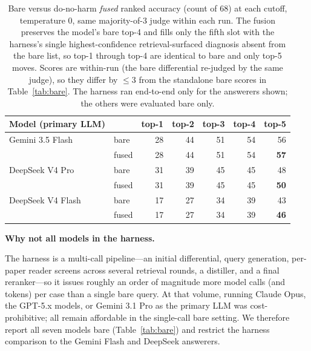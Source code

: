 \documentclass{article}
\renewcommand{\paragraph}[1]{%
  \par\addvspace{0.42\baselineskip}%
  \noindent\textbf{#1}\par\nobreak\vspace{-0.28\baselineskip}%
}
\begin{document}
\begin{table}[t]
\centering
\begin{tabular}{llrrrrr}
\toprule
Model (primary LLM) & & top-1 & top-2 & top-3 & top-4 & top-5 \\
\midrule
Gemini 3.5 Flash  & bare  & 28 & 44 & 51 & 54 & 56 \\
                  & fused & 28 & 44 & 51 & 54 & \textbf{57} \\
\midrule
DeepSeek V4 Pro   & bare  & 31 & 39 & 45 & 45 & 48 \\
                  & fused & 31 & 39 & 45 & 45 & \textbf{50} \\
\midrule
DeepSeek V4 Flash & bare  & 17 & 27 & 34 & 39 & 43 \\
                  & fused & 17 & 27 & 34 & 39 & \textbf{46} \\
\bottomrule
\end{tabular}
\caption{Bare versus do-no-harm \emph{fused} ranked accuracy (count of 68) at each cutoff, temperature 0,
same majority-of-3 judge within each run. The fusion preserves the model's bare top-4 and fills only the
fifth slot with the harness's single highest-confidence retrieval-surfaced diagnosis absent from the bare
list, so top-1 through top-4 are identical to bare and only top-5 moves. Scores are within-run (the bare
differential re-judged by the same judge), so they differ by $\le 3$ from the standalone bare scores in
Table~\ref{tab:bare}. The harness ran end-to-end only for the answerers shown; the others were evaluated
bare only.}
\label{tab:harness}
\end{table}

\paragraph{Why not all models in the harness.} The harness is a multi-call pipeline---an initial
differential, query generation, per-paper reader screens across several retrieval rounds, a distiller, and a
final reranker---so it issues roughly an order of magnitude more model calls (and tokens) per case than a
single bare query. At that volume, running Claude Opus, the GPT-5.x models, or Gemini 3.1 Pro as the primary
LLM was cost-prohibitive; all remain affordable in the single-call bare setting. We therefore report all
seven models bare (Table~\ref{tab:bare}) and restrict the harness comparison to the Gemini Flash and DeepSeek
answerers.
\end{document}
